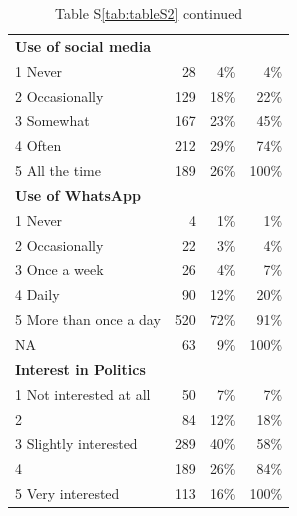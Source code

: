 \documentclass[empirical, authordate, issue]{jote-new-article}
\begin{document}
\begin{table}

  \caption{Table S\ref{tab:tableS2} continued}

  \begin{tabularx}{\linewidth}{@{} X r r r @{}}
    \textbf{Use of social media }   &     &      &       \\
    1 Never                         & 28  & 4\%  & 4\%   \\
    2 Occasionally                  & 129 & 18\% & 22\%  \\
    3 Somewhat                      & 167 & 23\% & 45\%  \\
    4 Often                         & 212 & 29\% & 74\%  \\
    5 All the time                  & 189 & 26\% & 100\% \\
    \textbf{Use of \mbox{WhatsApp}} &     &      &       \\
    1 Never                         & 4   & 1\%  & 1\%   \\
    2 Occasionally                  & 22  & 3\%  & 4\%   \\
    3 Once a week                   & 26  & 4\%  & 7\%   \\
    4 Daily                         & 90  & 12\% & 20\%  \\
    5 More than once a day          & 520 & 72\% & 91\%  \\
    NA                              & 63  & 9\%  & 100\% \\
    \textbf{Interest in Politics}   &     &      &       \\
    1 Not interested at all         & 50  & 7\%  & 7\%   \\
    2                               & 84  & 12\% & 18\%  \\
    3 Slightly interested           & 289 & 40\% & 58\%  \\
    4                               & 189 & 26\% & 84\%  \\
    5 Very interested               & 113 & 16\% & 100\% \\
    \bottomrule
  \end{tabularx}
\end{table}
\end{document}
